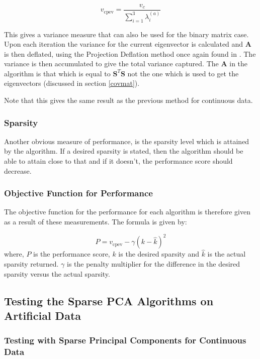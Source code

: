 \documentclass[11pt,a4paper]{article}
\newcommand{\smat}{\mathbf{S}}
\newcommand{\covmat}{\mathbf{A}}
\newcommand{\tp}{^T}
\begin{document}
\begin{equation*}
v_\text{cpev} = \frac{v_c}{\sum_{i=1}^3\lambda^{(a)}_i}
\end{equation*}

This gives a variance measure that can also be used for the binary matrix case. Upon each iteration the variance for the current eigenvector is calculated and $\covmat$ is then deflated, using the Projection Deflation method once again found in \cite{Mackey_deflationmethods}. The variance is then accumulated to give the total variance captured. The $\covmat$ in the algorithm is that which is equal to $\smat\tp\smat$ not the one which is used to get the eigenvectors (discussed in section \ref{covmat}).

Note that this gives the same result as the previous method for continuous data. 
\subsubsection{Sparsity}
Another obvious measure of performance, is the sparsity level which is attained by the algorithm. If a desired sparsity is stated, then the algorithm should be able to attain close to that and if it doesn't, the performance score should decrease. 

\subsubsection{Objective Function for Performance}
The objective function for the performance for each algorithm is therefore given as a result of these measurements. The formula is given by:

\begin{equation}
P = v_\text{cpev} - \gamma \left(k - \hat{k}\right)^2
\label{obj_function}
\end{equation}
where, $P$ is the performance score, $k$ is the desired sparsity and $\hat{k}$ is the actual sparsity returned. $\gamma$ is the penalty multiplier for the difference in the desired sparsity versus the actual sparsity.







\subsection{Testing the Sparse PCA Algorithms on Artificial Data}\label{testing}
\subsubsection{Testing with Sparse Principal Components for Continuous Data}

\end{document}
